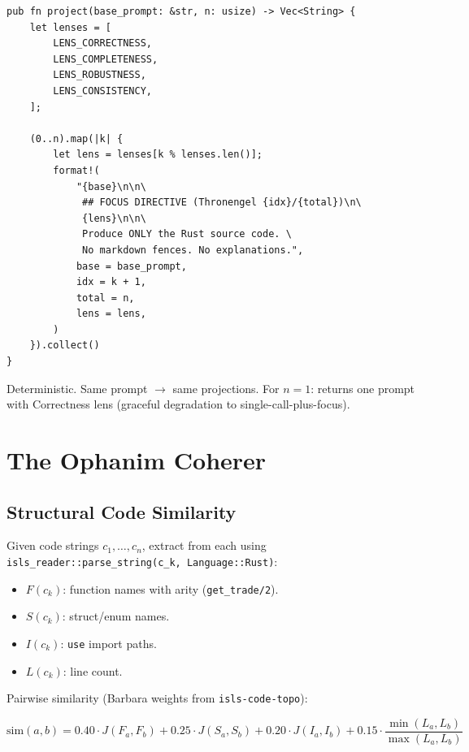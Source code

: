 \documentclass[11pt,a4paper]{article}
\begin{document}
\begin{lstlisting}[style=rust]
pub fn project(base_prompt: &str, n: usize) -> Vec<String> {
    let lenses = [
        LENS_CORRECTNESS,
        LENS_COMPLETENESS,
        LENS_ROBUSTNESS,
        LENS_CONSISTENCY,
    ];
    
    (0..n).map(|k| {
        let lens = lenses[k % lenses.len()];
        format!(
            "{base}\n\n\
             ## FOCUS DIRECTIVE (Thronengel {idx}/{total})\n\
             {lens}\n\n\
             Produce ONLY the Rust source code. \
             No markdown fences. No explanations.",
            base = base_prompt,
            idx = k + 1,
            total = n,
            lens = lens,
        )
    }).collect()
}
\end{lstlisting}

Deterministic. Same prompt $\to$ same projections. 
For $n = 1$: returns one prompt with Correctness lens 
(graceful degradation to single-call-plus-focus).


\section{The Ophanim Coherer}
\label{sec:ophanim}

\subsection{Structural Code Similarity}

Given code strings $c_1, \ldots, c_n$, extract from each using 
\texttt{isls\_reader::parse\_string(c\_k, Language::Rust)}:

\begin{itemize}[nosep]
\item $F(c_k)$: function names with arity (\texttt{get\_trade/2}).
\item $S(c_k)$: struct/enum names.
\item $I(c_k)$: \texttt{use} import paths.
\item $L(c_k)$: line count.
\end{itemize}

Pairwise similarity (Barbara weights from \texttt{isls-code-topo}):

\begin{equation}
\text{sim}(a, b) = 0.40 \cdot J(F_a, F_b) + 0.25 \cdot J(S_a, S_b) 
                  + 0.20 \cdot J(I_a, I_b) + 0.15 \cdot \frac{\min(L_a, L_b)}{\max(L_a, L_b)}
\label{eq:sim}
\end{equation}
\end{document}

